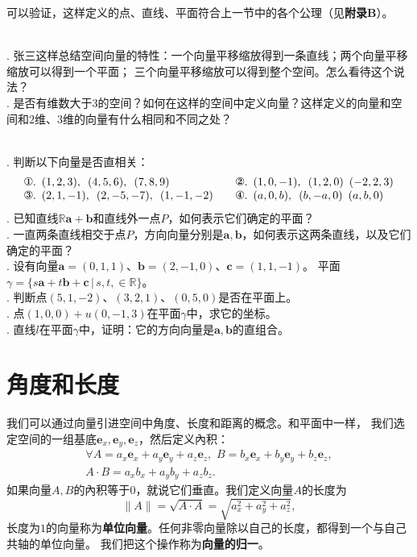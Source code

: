 \documentclass[12pt,UTF8,fontset=none]{ctexbook}
\begin{document}
可以验证，这样定义的点、直线、平面符合上一节中的各个公理（见\textbf{附录B}）。

\begin{sk}
    \mbox{}  \\
    . 张三这样总结空间向量的特性：一个向量平移缩放得到一条直线；两个向量平移缩放可以得到一个平面；
    三个向量平移缩放可以得到整个空间。怎么看待这个说法？\\
    . 是否有维数大于$3$的空间？如何在这样的空间中定义向量？这样定义的向量和空间和$2$维、$3$维的向量有什么相同和不同之处？
\end{sk}

\begin{xt}
    \mbox{}  \\
    . 判断以下向量是否直相关：\\
    $$
    \begin{array}{ll}
        \mbox{\ding{172}}.\,\,\, (1,2,3),\,\,\,(4,5,6), \,\,\,(7,8,9) \quad & \mbox{\ding{173}}.\,\,\, (1,0,-1),\,\,\, (1,2,0) \,\,\,(-2,2,3)  \\
        \mbox{\ding{174}}.\,\,\, (2,1,-1), \,\,\, (2,-5,-7), \,\,\,(1,-1,-2) \quad & \mbox{\ding{175}}.\,\,\, (a,0,b),\,\,\, (b,-a,0) \,\,\,(a,b,0) 
    \end{array}
    $$
    . 已知直线$\mathbb{R}\mathbf{a}+\mathbf{b}$和直线外一点$P$，如何表示它们确定的平面？\\
    . 一直两条直线相交于点$P$，方向向量分别是$\mathbf{a},\mathbf{b}$，如何表示这两条直线，以及它们确定的平面？\\
    . 设有向量$\mathbf{a}=(0,1,1)$、$\mathbf{b}=(2,-1,0)$、$\mathbf{c}=(1,1,-1)$。
    平面$\gamma = \{s\mathbf{a} + t\mathbf{b} + \mathbf{c} \, | \, s,t,\in\mathbb{R}\}$。\\
    . 判断点$(5,1,-2)$、$(3,2,1)$、$(0,5,0)$是否在平面上。\\
    . 点$(1,0,0)+u(0,-1,3)$在平面$\gamma$中，求它的坐标。\\
    . 直线$l$在平面$\gamma$中，证明：它的方向向量是$\mathbf{a},\mathbf{b}$的直组合。
\end{xt}

\section{角度和长度}
我们可以通过向量引进空间中角度、长度和距离的概念。和平面中一样，
我们选定空间的一组基底$\mathbf{e}_x,\mathbf{e}_y,\mathbf{e}_z$，然后定义內积：
$$
\begin{array}{c}
    \forall  A = a_x\mathbf{e}_x+a_y\mathbf{e}_y+a_z\mathbf{e}_z,\,\,B = b_x\mathbf{e}_x+b_y\mathbf{e}_y+b_z\mathbf{e}_z,  \\
     A\cdot B = a_xb_x + a_yb_y + a_zb_z. 
\end{array}
$$ 
如果向量$A,B$的內积等于$0$，就说它们垂直。我们定义向量$A$的长度为
$$\|A\| = \sqrt{A\cdot A} = \sqrt{a_x^2 + a_y^2 + a_z^2},$$
长度为$1$的向量称为\textbf{单位向量}。任何非零向量除以自己的长度，都得到一个与自己共轴的单位向量。
我们把这个操作称为\textbf{向量的归一}。
\end{document}
